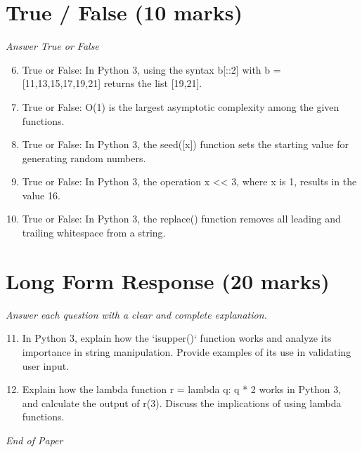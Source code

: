\documentclass[12pt]{article}
\begin{document}
\section*{True / False (10 marks)}
\textit{Answer True or False}
\begin{enumerate}[label=\arabic*.]
\setcounter{enumi}{5}
\item True or False: In Python 3, using the syntax b[::2] with b = [11,13,15,17,19,21] returns the list [19,21].
\item True or False: O(1) is the largest asymptotic complexity among the given functions.
\item True or False: In Python 3, the seed([x]) function sets the starting value for generating random numbers.
\item True or False: In Python 3, the operation x \textless{}\textless{} 3, where x is 1, results in the value 16.
\item True or False: In Python 3, the replace() function removes all leading and trailing whitespace from a string.
\end{enumerate}

\section*{Long Form Response (20 marks)}
\textit{Answer each question with a clear and complete explanation.}
\begin{enumerate}[label=\arabic*.]
\setcounter{enumi}{10}
\item In Python 3, explain how the `isupper()` function works and analyze its importance in string manipulation. Provide examples of its use in validating user input.
\item Explain how the lambda function r = lambda q: q * 2 works in Python 3, and calculate the output of r(3). Discuss the implications of using lambda functions.
\end{enumerate}

\vfill
\noindent\textit{End of Paper}
\end{document}
